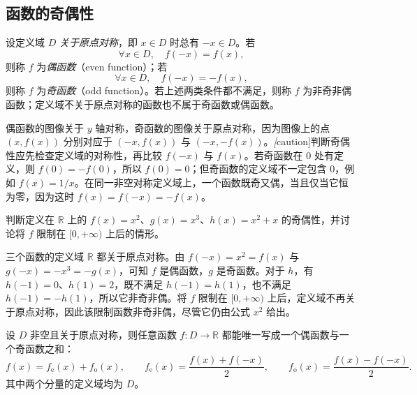 \documentclass[UTF8,12pt,a4paper,fontset=fandol]{ctexbook}
\begin{document}
\subsection{函数的奇偶性}
\label{subsec:parity-of-functions}

\begin{definition}
\label{def:even-and-odd-functions}
设定义域 $D$ \emph{关于原点对称}，即 $x\in D$ 时总有 $-x\in D$。若
\[
    \forall x\in D,\quad f(-x)=f(x),
\]
则称 $f$ 为\emph{偶函数}（even function）；若
\[
    \forall x\in D,\quad f(-x)=-f(x),
\]
则称 $f$ 为\emph{奇函数}（odd function）。若上述两类条件都不满足，则称 $f$ 为非奇非偶函数；定义域不关于原点对称的函数也不属于奇函数或偶函数。
\end{definition}

偶函数的图像关于 $y$ 轴对称，奇函数的图像关于原点对称，因为图像上的点 $(x,f(x))$ 分别对应于 $(-x,f(x))$ 与 $(-x,-f(x))$。\emph[caution]{判断奇偶性应先检查定义域的对称性，再比较 $f(-x)$ 与 $f(x)$。}若奇函数在 $0$ 处有定义，则 $f(0)=-f(0)$，所以 $f(0)=0$；但奇函数的定义域不一定包含 $0$，例如 $f(x)=1/x$。在同一非空对称定义域上，一个函数既奇又偶，当且仅当它恒为零，因为这时 $f(x)=f(-x)=-f(x)$。

\begin{example}
\label{ex:parity-and-domain}
判断定义在 $\mathbb{R}$ 上的 $f(x)=x^2$、$g(x)=x^3$、$h(x)=x^2+x$ 的奇偶性，并讨论将 $f$ 限制在 $[0,+\infty)$ 上后的情形。
\end{example}

\begin{solve}
三个函数的定义域 $\mathbb{R}$ 都关于原点对称。由 $f(-x)=x^2=f(x)$ 与 $g(-x)=-x^3=-g(x)$，可知 $f$ 是偶函数，$g$ 是奇函数。对于 $h$，有 $h(-1)=0$、$h(1)=2$，既不满足 $h(-1)=h(1)$，也不满足 $h(-1)=-h(1)$，所以它非奇非偶。将 $f$ 限制在 $[0,+\infty)$ 上后，定义域不再关于原点对称，因此该限制函数非奇非偶，尽管它仍由公式 $x^2$ 给出。
\end{solve}

\begin{proposition}[奇偶分解]
\label{prop:even-odd-decomposition}
设 $D$ 非空且关于原点对称，则任意函数 $f:D\to\mathbb{R}$ 都能唯一写成一个偶函数与一个奇函数之和：
\begin{equation}
    f(x)=f_{\mathrm e}(x)+f_{\mathrm o}(x),\qquad
    f_{\mathrm e}(x)=\frac{f(x)+f(-x)}{2},\qquad
    f_{\mathrm o}(x)=\frac{f(x)-f(-x)}{2}.
    \label{eq:even-odd-decomposition}
\end{equation}
其中两个分量的定义域均为 $D$。
\end{proposition}
\end{document}
